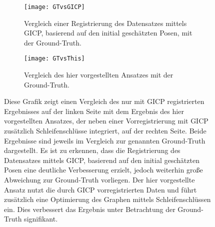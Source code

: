 \begin{figure}
	\centering
	\begin{subfigure}{.5\textwidth}
		 \centering
  		 \texttt{[image: GTvsGICP]}
  		 \centering \caption{Vergleich einer Registrierung des Datensatzes mittels GICP, basierend auf den initial geschätzten Posen, mit der Ground-Truth.}
  		 \label{fig:Han1Initial}
	\end{subfigure}%
	\begin{subfigure}{.5\textwidth}
    	\centering
  		\texttt{[image: GTvsThis]}
  		\centering \caption{Vergleich des hier vorgestellten Ansatzes mit der Ground-Truth.}
  		\label{fig:Han1GT}
	\end{subfigure}
	\caption{Diese Grafik zeigt einen Vergleich des nur mit GICP registrierten Ergebnisses auf der linken Seite mit dem Ergebnis des hier vorgestellten Ansatzes, der neben einer Vorregistrierung mit GICP zusätzlich Schleifenschlüsse integriert, auf der rechten Seite. Beide Ergebnisse sind jeweils im Vergleich zur genannten Ground-Truth dargestellt. Es ist zu erkennen, dass die Registrierung des Datensatzes mittels GICP, basierend auf den initial geschätzten Posen eine deutliche Verbesserung erzielt, jedoch weiterhin große Abweichung zur Ground-Truth vorliegen. Der hier vorgestellte Ansatz nutzt die durch GICP vorregistrierten Daten und führt zusätzlich eine Optimierung des Graphen mittels Schleifenschlüssen ein. Dies verbessert das Ergebnis unter Betrachtung der Ground-Truth signifikant.}
	\label{fig:Han1This}
\end{figure}


